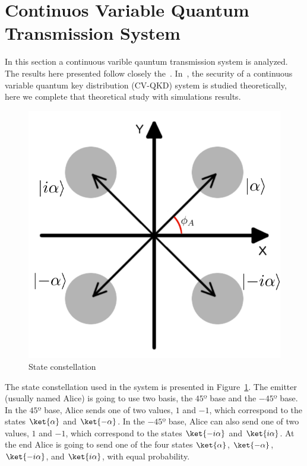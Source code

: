 %
%
%
%
%

\section{Continuos Variable Quantum Transmission System}\label{sec:intro}

In this section a continuous varible qauntum transmission system is analyzed.
The results here presented follow closely the~\cite{namiki2003security}.
In~\cite{namiki2003security}, the security of a continuous variable quantum key distribution (CV-QKD) system is studied theoretically, here we complete that theoretical study with simulations results.

\begin{figure}[h]
\centering
\includegraphics[width=.5\linewidth]{./sdf/cv_system/figures/constellation.png}
\caption{State constellation}
\label{fig:const}
\end{figure}

The state constellation used in the system is presented in Figure~\ref{fig:const}.
The emitter (usually named Alice) is going to use two basis, the $45º$ base and the $-45º$ base.
In the $45º$ base, Alice sends one of two values, $1$ and $-1$, which correspond to the states $\ket{\alpha}$ and $\ket{-\alpha}$.
In the $-45º$ base, Alice can also send one of two values, $1$ and $-1$, which correspond to the states $\ket{-i\alpha}$ and $\ket{i\alpha}$.
At the end Alice is going to send one of the four states $\ket{\alpha}$, $\ket{-\alpha}$, $\ket{-i\alpha}$, and $\ket{i\alpha}$, with equal probability.

